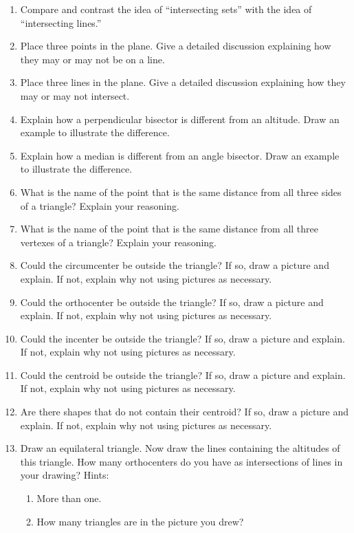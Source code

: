 \begin{problems}
\begin{enumerate}
\item Compare and contrast the idea of ``intersecting sets'' with the
  idea of ``intersecting lines.''
\item Place three points in the plane. Give a detailed discussion
  explaining how they may or may not be on a line.
\item Place three lines in the plane. Give a detailed discussion explaining
  how they may or may not intersect.
\item Explain how a perpendicular bisector is different from an
  altitude. Draw an example to illustrate the difference.
\item Explain how a median is different from an angle bisector.  Draw an
  example to illustrate the difference.
\item What is the name of the point that is the same distance from all
  three sides of a triangle? Explain your reasoning.
\item What is the name of the point that is the same distance from all
  three vertexes of a triangle? Explain your reasoning.
\item Could the circumcenter be outside the triangle? If so, draw a
  picture and explain. If not, explain why not using pictures as
  necessary.
\item Could the orthocenter be outside the triangle? If so, draw a
  picture and explain. If not, explain why not using pictures as
  necessary.
\item Could the incenter be outside the triangle? If so, draw a
  picture and explain. If not, explain why not using pictures as
  necessary.
\item Could the centroid be outside the triangle? If so, draw a
  picture and explain. If not, explain why not using pictures as
  necessary.
\item Are there shapes that do not contain their centroid? If so, draw
  a picture and explain. If not, explain why not using pictures as
  necessary.
\item Draw an equilateral triangle. Now draw the lines containing the
  altitudes of this triangle. How many orthocenters do you have as
  intersections of lines in your drawing? Hints:
\begin{enumerate}
\item More than one.
\item How many triangles are in the picture you drew?
\end{enumerate}

\end{enumerate}
\end{problems}
